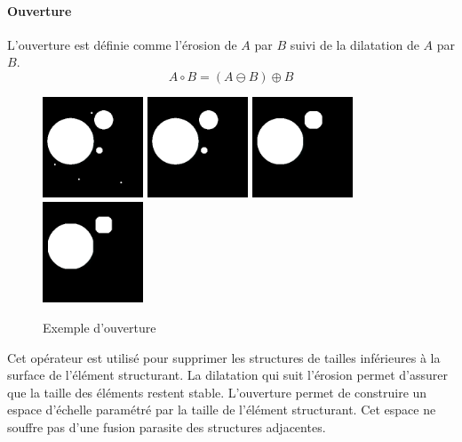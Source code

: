   \paragraph{Ouverture}
  L'ouverture est définie comme l'érosion de $A$ par $B$ suivi de la dilatation de $A$ par $B$.
  \begin{equation}
   A \circ B = (A \ominus B) \oplus B
  \end{equation}
  
  \begin{figure}[h]
    \centering
    \includegraphics[height=3cm]{Images/morpho_init.png}
    \includegraphics[height=3cm]{Images/morpho_open_k5.png}
    \includegraphics[height=3cm]{Images/morpho_open_k21.png}
    \includegraphics[height=3cm]{Images/morpho_open_k31.png}
    \label{fig:morpho_ouverture}
    \caption{Exemple d'ouverture}
  \end{figure}
  
  Cet opérateur est utilisé pour supprimer les structures de tailles inférieures à la surface de l'élément structurant. La dilatation qui suit l'érosion permet d'assurer que la taille des éléments restent stable.   L'ouverture permet de construire un espace d'échelle paramétré par la taille de l'élément structurant. Cet espace ne souffre pas d'une fusion parasite des structures adjacentes.
  
